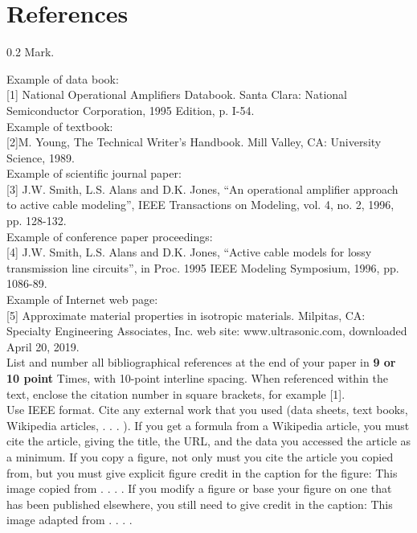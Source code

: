 \documentclass[journal]{IEEEtran}
\begin{document}

\printbibliography

\section*{References}
\begin{flushright} 0.2 Mark. \end{flushright}

Example of data book:\\[0.1in]
[1] National Operational Amplifiers Databook. Santa Clara: National Semiconductor
Corporation, 1995 Edition, p. I-54. \\[0.1in]
Example of textbook: \\[0.1in]
[2]M. Young, The Technical Writer’s Handbook. Mill Valley, CA: University Science, 1989.\\[0.1in]
Example of scientific journal paper:\\[0.1in]
[3] J.W. Smith, L.S. Alans and D.K. Jones, “An operational amplifier approach to
active cable modeling”, IEEE Transactions on Modeling, vol. 4, no. 2, 1996, pp.
128-132.\\[0.1in]
Example of conference paper proceedings:\\[0.1in]
[4] J.W. Smith, L.S. Alans and D.K. Jones, “Active cable models for lossy
transmission line circuits”, in Proc. 1995 IEEE Modeling Symposium, 1996, pp.
1086-89.\\[0.1in]

Example of Internet web page:\\[0.1in]
[5] Approximate material properties in isotropic materials. Milpitas, CA: Specialty Engineering Associates, Inc. web site: www.ultrasonic.com, downloaded April 20, 2019.  \\[0.1in]

List and number all bibliographical 
references at the end of your paper in {\bf 9 or 10 point} Times, with 10-point interline spacing. When referenced within the text, enclose the citation number in square brackets, for example [1].\\[0.1in]
Use IEEE format. Cite any external work that you used (data sheets, text books, Wikipedia articles, . . . ). If you get a formula from a Wikipedia article, you must cite the article, giving the title, the URL, and the data you accessed the article as a minimum. If you copy a figure, not only must you cite the article you copied from, but you must give explicit figure credit in the caption for the figure: This image copied from . . . . If you modify a figure or base your figure on one that has been published elsewhere, you still need to give credit in the caption: This image adapted from . . . .
\end{document}
